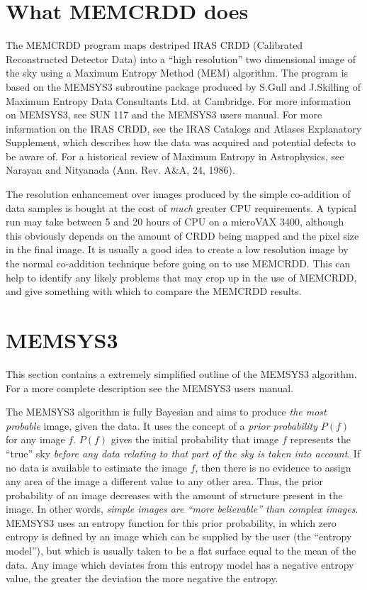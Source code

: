 \section {What MEMCRDD does}

The MEMCRDD program maps destriped IRAS CRDD (Calibrated Reconstructed Detector
Data) into a ``high resolution'' two dimensional image of the sky using a
Maximum Entropy Method (MEM) algorithm. The program is based on the MEMSYS3
subroutine package produced by S.Gull and J.Skilling of Maximum Entropy Data
Consultants Ltd. at Cambridge. For more information on MEMSYS3, see SUN 117 and
the MEMSYS3 users manual. For more information on the IRAS CRDD, see the IRAS
Catalogs and Atlases Explanatory Supplement, which describes how the data was
acquired and potential defects to be aware of. For a historical review of
Maximum Entropy in  Astrophysics, see Narayan and Nityanada (Ann. Rev. A\&A,
24, 1986).

The resolution enhancement over images produced by the simple co-addition of
data samples is bought at the cost of {\em much} greater CPU requirements. A
typical run may take between 5 and 20 hours of CPU on a microVAX 3400,
although this obviously depends on the amount of CRDD being mapped and the
pixel size in the final image. It is usually a good idea to create a low
resolution image by the normal co-addition technique before going on to use
MEMCRDD. This can help to identify any likely problems that may crop up in the
use of MEMCRDD, and give something with which to compare the MEMCRDD  results.


\section {MEMSYS3}

This section contains a extremely simplified outline of the MEMSYS3 algorithm.
For a more complete description see the MEMSYS3 users manual.

The MEMSYS3 algorithm is fully Bayesian and aims to produce {\em the most
probable} image, given the data. It uses the concept of a {\em prior
probability} $P(f)$ for any image $f$. $P(f)$ gives the initial probability
that image $f$ represents the ``true'' sky {\em before any data relating to
that part of the sky is taken into account}. If no data is available to
estimate the image $f$, then there is no evidence to assign any area of the
image a different value to any other area. Thus, the prior probability of an
image decreases with the  amount of structure present in the image. In other
words, {\em simple images are  ``more believable'' than complex images}.
MEMSYS3 uses an entropy function for  this prior probability, in which zero
entropy is defined by an image which can  be supplied by the user (the
``entropy model''), but which is usually taken to  be a flat surface equal to
the mean of the data. Any image which deviates from  this entropy model has a
negative entropy value, the greater the deviation the  more negative the
entropy.

